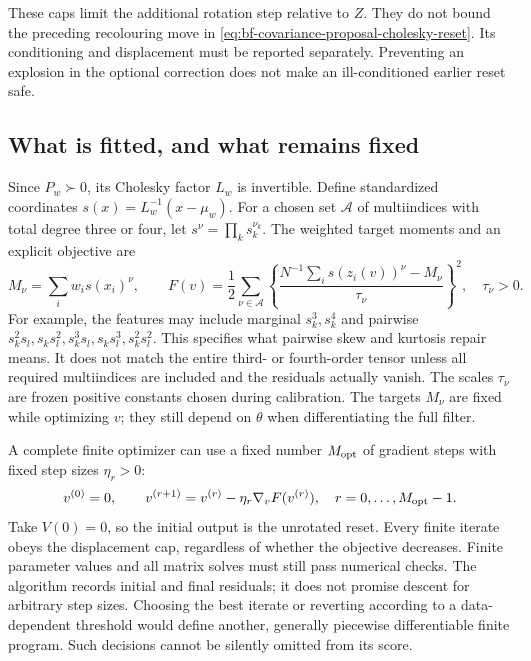 These caps limit the additional rotation step relative to \(Z\).
They do not bound the preceding recolouring move in
\eqref{eq:bf-covariance-proposal-cholesky-reset}. Its conditioning and displacement must be
reported separately. Preventing an explosion in the optional correction
does not make an ill-conditioned earlier reset safe.

\subsection{What is fitted, and what remains fixed}

Since \(P_w\succ0\), its Cholesky factor \(L_w\) is invertible.
Define standardized coordinates \(s(x)=L_w^{-1}(x-\mu_w)\).
For a chosen set \(\mathcal A\) of multiindices with total degree three
or four, let \(s^\nu=\prod_k s_k^{\nu_k}\). The weighted target moments
and an explicit objective are
\begin{equation}
\label{eq:bf-covariance-proposal-moment-objective}
 M_\nu=\sum_iw_i s(x_i)^\nu,\qquad
 F(v)=\frac12\sum_{\nu\in\mathcal A}
 \left\{\frac{N^{-1}\sum_i s(z_i(v))^\nu-M_\nu}{\tau_\nu}\right\}^{\!2},
 \quad \tau_\nu>0 .
\end{equation}
For example, the features may include marginal \(s_k^3,s_k^4\) and
pairwise \(s_k^2s_l,\allowbreak s_ks_l^2,\allowbreak s_k^3s_l,\allowbreak s_ks_l^3,\allowbreak s_k^2s_l^2\).
This specifies what pairwise skew and kurtosis repair means. It does not
match the entire third- or fourth-order tensor unless all required
multiindices are included and the residuals actually vanish.
The scales \(\tau_\nu\) are frozen positive constants chosen during
calibration. The targets \(M_\nu\) are fixed while optimizing \(v\);
they still depend on \(\theta\) when differentiating the full filter.

A complete finite optimizer can use a fixed number \(M_{\rm opt}\) of
gradient steps with fixed step sizes \(\eta_r>0\):
\begin{equation}
\label{eq:bf-covariance-proposal-fixed-optimizer}
 v^{(0)}=0,\qquad
 v^{(r+1)}=v^{(r)}-\eta_r\nabla_v F(v^{(r)}),
 \quad r=0,\ldots,M_{\rm opt}-1.
\end{equation}
Take \(V(0)=0\), so the initial output is the unrotated reset.
Every finite iterate obeys the displacement cap, regardless of whether
the objective decreases. Finite parameter values and all matrix solves
must still pass numerical checks. The algorithm records initial and
final residuals; it does not promise descent for arbitrary step sizes.
Choosing the best iterate or reverting according to a data-dependent
threshold would define another, generally piecewise differentiable
finite program. Such decisions cannot be silently omitted from its score.

